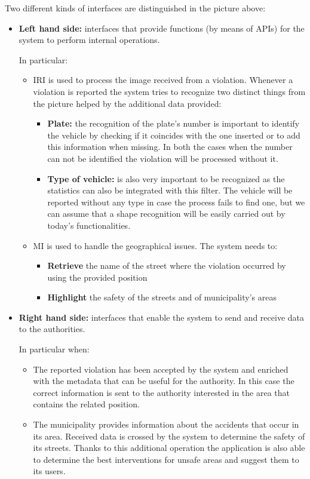 		Two different kinds of interfaces are distinguished in the picture above:
		\begin{itemize}
			\item \textbf{Left hand side:} interfaces that provide functions (by means of APIs) for the system to perform internal operations. 
			
			In particular:
			\begin{itemize}
				\item \textsc{IRI} is used to process the image received from a violation. Whenever a violation is reported the system tries to recognize two distinct things from the picture helped by the additional data provided:
				\begin{itemize}
					\item \textbf{Plate:} the recognition of the plate's number is important to identify the vehicle by checking if it coincides with the one inserted or to add this information when missing. In both the cases when the number can not be identified the violation will be processed without it.
					\item \textbf{Type of vehicle:} is also very important to be recognized as the statistics can also be integrated with this filter. The vehicle will be reported without any type in case the process fails to find one, but we can assume that a shape recognition will be easily carried out by today's functionalities.
				\end{itemize} 
				\item \textsc{MI} is used to handle the geographical issues. The system needs to:
				\begin{itemize}
					\item \textbf{Retrieve} the name of the street where the violation occurred by using the provided position
					\item \textbf{Highlight} the safety of the streets and of municipality's areas
				\end{itemize}
			\end{itemize}
			\item \textbf{Right hand side:} interfaces that enable the system to send and receive data to the authorities. 
			
			In particular when:
			\begin{itemize}
				\item The reported violation has been accepted by the system and enriched with the metadata that can be useful for the authority. In this case the correct information is sent to the authority interested in the area that contains the related position.
				\item The municipality provides information about the accidents that occur in its area. Received data is crossed by the system to determine the safety of its streets. Thanks to this additional operation the application is also able to determine the best interventions for unsafe areas and suggest them to its users.
			\end{itemize}
		\end{itemize}
	
